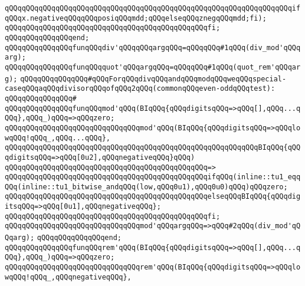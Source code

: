 \verb|qQQqqQQqqQQqqQQqqQQqqQQqqQQqqQQqqQQqqQQqqQQqqQQqqQQqqQQqqQQqqQQqqQQqifqQQqx.negativeqQQqqQQqposiqQQqmdd;qQQqelseqQQqznegqQQqmdd;fi);|\newline
\verb|qQQqqQQqqQQqqQQqqQQqqQQqqQQqqQQqqQQqqQQqqQQqqQQqfi;|\newline
\verb|qQQqqQQqqQQqqQQqend;|\newline
\newline
\verb|qQQqqQQqqQQqqQQqfunqQQqdiv'qQQqqQQqargqQQq=qQQqqQQq#1qQQq(div_mod'qQQqarg);|\newline
\verb|qQQqqQQqqQQqqQQqfunqQQqquot'qQQqargqQQq=qQQqqQQq#1qQQq(quot_rem'qQQqarg);|\newline
\newline
\verb|qQQqqQQqqQQqqQQq#qQQqForqQQqdivqQQqandqQQqmodqQQqweqQQqspecial-caseqQQqaqQQqdivisorqQQqofqQQq2qQQq(commonqQQqeven-oddqQQqtest):|\newline
\verb|qQQqqQQqqQQqqQQq#|\newline
\verb|qQQqqQQqqQQqqQQqfunqQQqmod'qQQq(BIqQQq{qQQqdigitsqQQq=>qQQq[],qQQq...qQQq},qQQq_)qQQq=>qQQqzero;|\newline
\verb|qQQqqQQqqQQqqQQqqQQqqQQqqQQqqQQqmod'qQQq(BIqQQq{qQQqdigitsqQQq=>qQQqlowqQQq!qQQq_,qQQq...qQQq},|\newline
\verb|qQQqqQQqqQQqqQQqqQQqqQQqqQQqqQQqqQQqqQQqqQQqqQQqqQQqqQQqqQQqBIqQQq{qQQqdigitsqQQq=>qQQq[0u2],qQQqnegativeqQQq}qQQq)|\newline
\verb|qQQqqQQqqQQqqQQqqQQqqQQqqQQqqQQqqQQqqQQqqQQqqQQq=>|\newline
\verb|qQQqqQQqqQQqqQQqqQQqqQQqqQQqqQQqqQQqqQQqqQQqqQQqifqQQq(inline::tu1_eqqQQq(inline::tu1_bitwise_andqQQq(low,qQQq0u1),qQQq0u0)qQQq)qQQqzero;|\newline
\verb|qQQqqQQqqQQqqQQqqQQqqQQqqQQqqQQqqQQqqQQqqQQqqQQqelseqQQqBIqQQq{qQQqdigitsqQQq=>qQQq[0u1],qQQqnegativeqQQq};|\newline
\verb|qQQqqQQqqQQqqQQqqQQqqQQqqQQqqQQqqQQqqQQqqQQqqQQqfi;|\newline
\newline
\verb|qQQqqQQqqQQqqQQqqQQqqQQqqQQqqQQqmod'qQQqargqQQq=>qQQq#2qQQq(div_mod'qQQqarg);|\newline
\verb|qQQqqQQqqQQqqQQqend;|\newline
\newline
\verb|qQQqqQQqqQQqqQQqfunqQQqrem'qQQq(BIqQQq{qQQqdigitsqQQq=>qQQq[],qQQq...qQQq},qQQq_)qQQq=>qQQqzero;|\newline
\newline
\verb|qQQqqQQqqQQqqQQqqQQqqQQqqQQqqQQqrem'qQQq(BIqQQq{qQQqdigitsqQQq=>qQQqlowqQQq!qQQq_,qQQqnegativeqQQq},|\newline
